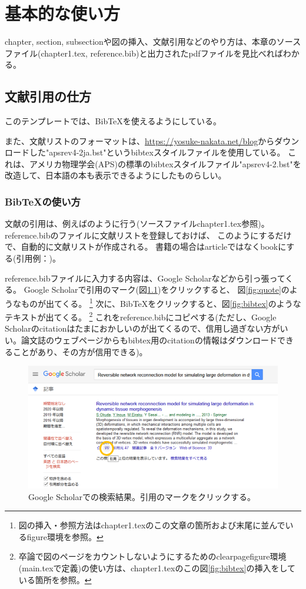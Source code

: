 \chapter{基本的な使い方}
chapter, section, subsectionや図の挿入、文献引用などのやり方は、本章のソースファイル(chapter1.tex, reference.bib)と出力されたpdfファイルを見比べればわかる。
\section{文献引用の仕方}
このテンプレートでは、BibTeXを使えるようにしている。

また、文献リストのフォーマットは、\url{https://yosuke-nakata.net/blog}からダウンロードした"apsrev4-2ja.bst"というbibtexスタイルファイルを使用している。
これは、アメリカ物理学会(APS)の標準のbibtexスタイルファイル"apsrev4-2.bst"を改造して、日本語の本も表示できるようにしたものらしい。
\subsection{BibTeXの使い方}
文献の引用は、例えば\cite{Okuda2013a}のように行う(ソースファイルchapter1.tex参照)。 
reference.bibのファイルに文献リストを登録しておけば、
このようにするだけで、自動的に文献リストが作成される。
書籍の場合はarticleではなくbookにする(引用例：\cite{Kobayashi1977})。

reference.bibファイルに入力する内容は、Google Scholarなどから引っ張ってくる。
Google Scholarで引用のマーク(図\ref{fig:googleScholar})をクリックすると、
図\ref{fig:quote}のようなものが出てくる。
\footnote{図の挿入・参照方法はchapter1.texのこの文章の箇所および末尾に並んでいるfigure環境を参照。}
次に、BibTeXをクリックすると、図\ref{fig:bibtex}のようなテキストが出てくる。
\footnote{卒論で図のページをカウントしないようにするためのclearpagefigure環境(main.texで定義)の使い方は、chapter1.texのこの図\ref{fig:bibtex}の挿入をしている箇所を参照。}
これをreference.bibにコピペする(ただし、Google Scholarのcitationはたまにおかしいのが出てくるので、信用し過ぎない方がいい。論文誌のウェブページからもbibtex用のcitationの情報はダウンロードできることがあり、その方が信用できる)。

\begin{figure}[htbp]
	\centering
	\includegraphics[width=12cm,clip]{fig/googleScholar.png}
	\caption{Google Scholarでの検索結果。引用のマークをクリックする。}
	\label{fig:googleScholar}
\end{figure}

